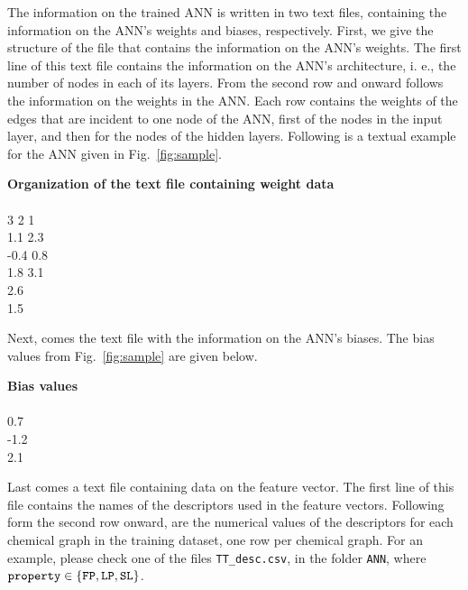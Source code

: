\documentclass[11pt, titlepage, dvipdfmx, twoside]{article}
\begin{document}
The information on the trained ANN is written in two text files, containing the information
on the ANN's weights and biases, respectively.
First, we give the structure of the file that contains the information on the ANN's weights.
The first line of this text file contains the information on the ANN's architecture, i. e., 
the number of nodes in each of its layers.
From the second row and onward
follows the information on the 
weights in the ANN.
Each row contains the weights of the edges that are incident to one node of the ANN,
first of the nodes in the input layer, and then for the nodes of the hidden layers.
Following is a textual example for the ANN given in Fig.~\ref{fig:sample}.

\bigskip

\begin{oframed}
{\bf Organization of the text file containing weight data}\\\\
3 2 1\\
1.1 2.3\\
-0.4 0.8\\
1.8 3.1\\
2.6\\
1.5\\
\end{oframed}

\bigskip


Next, comes the text file with the information on the ANN's biases.
The bias values from Fig.~\ref{fig:sample} are given below.

\bigskip

\begin{oframed}
{\bf Bias values}\\\\
0.7\\
-1.2\\
2.1\\
\end{oframed}

\bigskip

Last comes a text file containing data on the feature vector.
The first line of this file contains the names of the descriptors used in the feature vectors.
Following form the second row onward, are the numerical values of the descriptors for each chemical graph
in the training dataset, one row per chemical graph.
For an example, please check one of the files  {\tt TT\_desc.csv},  in the folder {\tt ANN},
where ${\tt property} \in \{{\tt FP, LP, SL}\}$.
\end{document}
